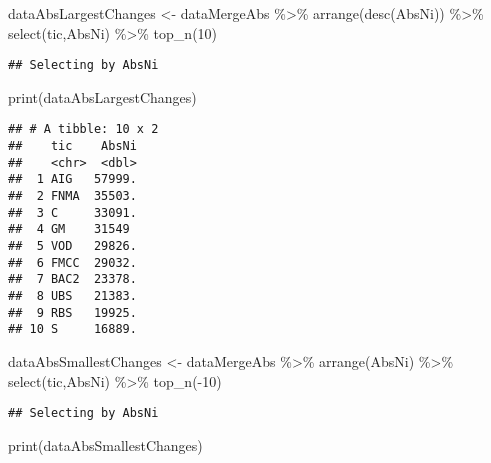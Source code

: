 \documentclass[
]{article}
\newenvironment{Shaded}{\begin{snugshade}}{\end{snugshade}}
\newcommand{\DecValTok}[1]{\textcolor[rgb]{0.00,0.00,0.81}{#1}}
\newcommand{\FunctionTok}[1]{\textcolor[rgb]{0.00,0.00,0.00}{#1}}
\newcommand{\NormalTok}[1]{#1}
\newcommand{\OtherTok}[1]{\textcolor[rgb]{0.56,0.35,0.01}{#1}}
\newcommand{\SpecialCharTok}[1]{\textcolor[rgb]{0.00,0.00,0.00}{#1}}
\begin{document}
\begin{Shaded}
\begin{Highlighting}[]
\NormalTok{dataAbsLargestChanges }\OtherTok{\textless{}{-}}\NormalTok{ dataMergeAbs }\SpecialCharTok{\%\textgreater{}\%} \FunctionTok{arrange}\NormalTok{(}\FunctionTok{desc}\NormalTok{(AbsNi)) }\SpecialCharTok{\%\textgreater{}\%} \FunctionTok{select}\NormalTok{(tic,AbsNi) }\SpecialCharTok{\%\textgreater{}\%} \FunctionTok{top\_n}\NormalTok{(}\DecValTok{10}\NormalTok{)}
\end{Highlighting}
\end{Shaded}

\begin{verbatim}
## Selecting by AbsNi
\end{verbatim}

\begin{Shaded}
\begin{Highlighting}[]
\FunctionTok{print}\NormalTok{(dataAbsLargestChanges)}
\end{Highlighting}
\end{Shaded}

\begin{verbatim}
## # A tibble: 10 x 2
##    tic    AbsNi
##    <chr>  <dbl>
##  1 AIG   57999.
##  2 FNMA  35503.
##  3 C     33091.
##  4 GM    31549 
##  5 VOD   29826.
##  6 FMCC  29032.
##  7 BAC2  23378.
##  8 UBS   21383.
##  9 RBS   19925.
## 10 S     16889.
\end{verbatim}

\begin{Shaded}
\begin{Highlighting}[]
\NormalTok{dataAbsSmallestChanges }\OtherTok{\textless{}{-}}\NormalTok{ dataMergeAbs }\SpecialCharTok{\%\textgreater{}\%} \FunctionTok{arrange}\NormalTok{(AbsNi) }\SpecialCharTok{\%\textgreater{}\%} \FunctionTok{select}\NormalTok{(tic,AbsNi) }\SpecialCharTok{\%\textgreater{}\%} \FunctionTok{top\_n}\NormalTok{(}\SpecialCharTok{{-}}\DecValTok{10}\NormalTok{)}
\end{Highlighting}
\end{Shaded}

\begin{verbatim}
## Selecting by AbsNi
\end{verbatim}

\begin{Shaded}
\begin{Highlighting}[]
\FunctionTok{print}\NormalTok{(dataAbsSmallestChanges)}
\end{Highlighting}
\end{Shaded}
\end{document}
